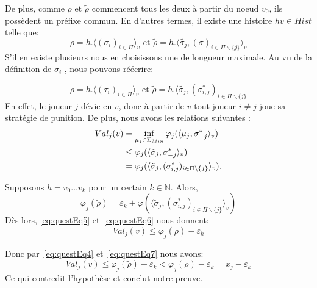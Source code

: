 \begin{demonstration}
\begin{itemize}
		De plus, comme $\rho$ et $\tilde{\rho}$ commencent tous les deux à partir du noeud $v_0$, ils possèdent un préfixe commun. En d'autres termes, il existe une histoire $hv \in Hist$ telle que: 
		\begin{equation*}
			\rho = h. \langle (\sigma_i)_{i\in\Pi} \rangle_v \text{ et } \tilde{\rho} =  h.\langle \tilde{\sigma_j}, (\sigma)_{i\in\Pi\backslash \{ j \}} \rangle_v
		\end{equation*}
		 S'il en existe plusieurs nous en choisissons une de longueur maximale.
		Au vu de la définition de $\sigma_i$ , nous pouvons réécrire:
		
		\begin{equation*}
			\rho = h. \langle (\tau_i)_{i\in\Pi} \rangle_v \text{ et } \tilde{\rho} = h.\langle \tilde{\sigma_j}, (\sigma^*_{i,j})_{i\in\Pi \backslash\{ j \}}
		\end{equation*}
		En effet, le joueur $j$ dévie en $v$, donc à partir de $v$ tout joueur $i \neq j$ joue sa stratégie de punition. De plus, nous avons les relations suivantes : 
		\begin{align}
			Val_j(v) &= \inf_{\mu_j\in\Sigma_{Min}}\varphi_j(\langle \mu_j, \sigma^*_{-j}\rangle_v)\notag\\
					 &\leq \varphi_j(\langle \tilde{\sigma}_j, \sigma^*_{-j}\rangle_v)\notag\\
					& = \varphi_j(\langle \tilde{\sigma}_j, (\sigma^*_{i,j})_{i \in \Pi \backslash \{ j \}}\rangle_v). \label{eq:questEq5}
		\end{align}
		
	Supposons $h = v_0 \ldots v_k$ pour un certain $k \in \mathbb{N}$. Alors,
	\begin{equation}
		\label{eq:questEq6}
		\varphi_j(\tilde{\rho}) = \varepsilon_k + \varphi(\langle \tilde{\sigma}_j , (\sigma^*_{i,j})_{i\in\Pi\backslash\{ j \}}\rangle_v)
	\end{equation}
	Dès lors, \eqref{eq:questEq5} et~\eqref{eq:questEq6} nous donnent:
	\begin{equation}
		\label{eq:questEq7}
		Val_j(v) \leq \varphi_j(\tilde{\rho}) - \varepsilon_k
	\end{equation}
	
	Donc par~\eqref{eq:questEq4} et~\eqref{eq:questEq7}  nous avons:
	$$ Val_j(v) \leq \varphi_j(\tilde{\rho})- \varepsilon_k < \varphi_j(\rho)-\varepsilon_k = x_j-\varepsilon_k$$
	Ce qui contredit l'hypothèse et conclut notre preuve.
	\end{itemize}
\end{demonstration}

